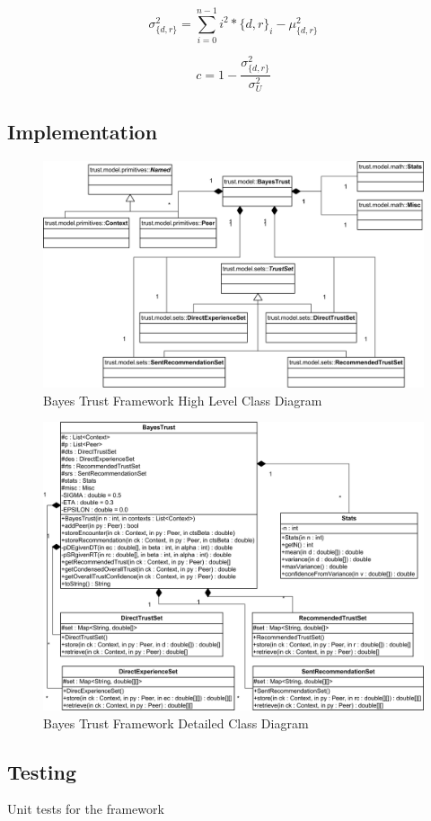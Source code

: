 \begin{equation}
\label{eq:bayes_variance}
\sigma^2_{\{d,r\}} = \sum_{i=0}^{n-1}{i^2*{\{d,r\}}_i} - \mu^2_{\{d,r\}}
\end{equation}

\begin{equation}
\label{eq:bayes_confidence}
c = 1 - \frac{\sigma^2_{\{d,r\}}}{\sigma^2_U}
\end{equation}


\subsection{Implementation}

\begin{figure}[h!]
  \centering  
  \includegraphics[width=1\textwidth]{images/bayestrust}
  \caption{Bayes Trust Framework High Level Class Diagram}
  \label{fig:xml2dttest}
\end{figure}

\begin{figure}[h!]
  \centering  
  \includegraphics[width=1\textwidth]{images/bayestrustdetail}
  \caption{Bayes Trust Framework Detailed Class Diagram}
  \label{fig:xml2dttest}
\end{figure}


\subsection{Testing}
Unit tests for the framework